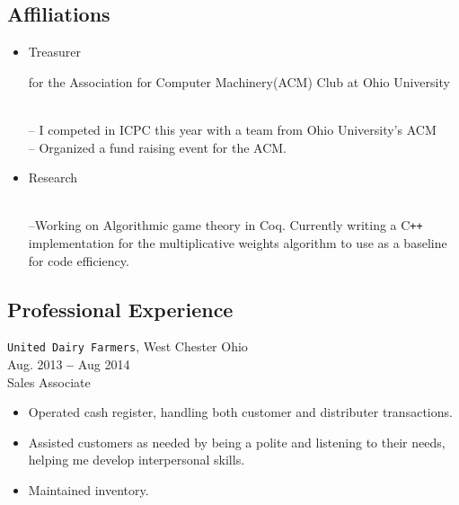 \documentclass[11pt]{article} %
\begin{document}
\subsection*{Affiliations}
\begin{itemize}
\item{\begin{bf}Treasurer\end{bf} for the Association for Computer Machinery(ACM) Club at Ohio University}\\
-- I competed in ICPC this year with a team from Ohio University's ACM \\
-- Organized a fund raising event for the ACM.
\item{\begin{bf}Research\end{bf} }\\--Working on Algorithmic game theory in Coq.  Currently writing a C\texttt{++} implementation for the multiplicative weights algorithm to use as a baseline for code efficiency.
\end{itemize}


\subsection*{Professional Experience}
\texttt{United Dairy Farmers}, West Chester Ohio\\
Aug. 2013 \textbf{--} Aug 2014\\
Sales Associate
\begin{itemize}
\item{Operated cash register, handling both customer and distributer transactions.}
\item{ Assisted customers as needed by being a polite and listening to their needs, helping me develop interpersonal skills.}
\item{ Maintained inventory.}
\end{itemize}

           
\end{document}
